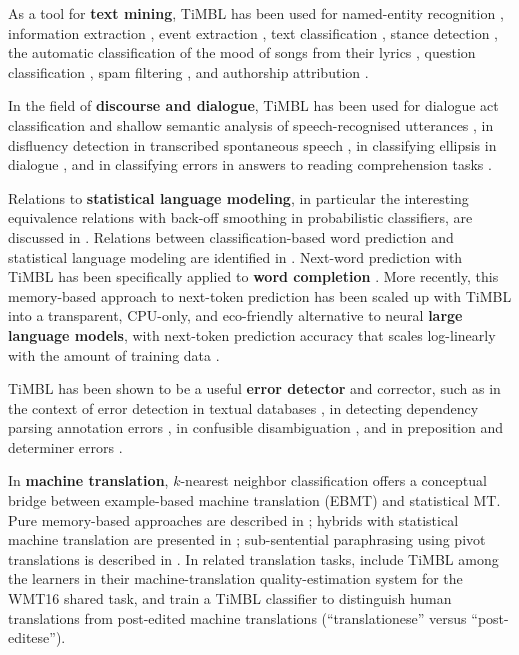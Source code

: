 \documentclass{book}
\begin{document}
As a tool for {\bf text mining}, TiMBL has been used for named-entity
recognition
\cite{Buchholz+00,Hendrickx+03,DeMeulder+03,Sporleder+06b,Leveling+06,VandenBosch+13c},
information extraction \cite{Zavrel+00b,Zavrel+03,Ahn06}, event
extraction \cite{Morante+09d}, text classification \cite{Spitters00},
stance detection \cite{Shenoy+17}, the automatic classification of the
mood of songs from their lyrics \cite{VanZaanen+10},
question classification \cite{Garcia+06,Dridan+07}, spam filtering
\cite{Androutsopoulos+00}, and authorship attribution
\cite{Luyckx+08,Kestemont+09}.

In the field of {\bf discourse and dialogue}, TiMBL has been used for
dialogue act classification and shallow semantic analysis of
speech-recognised utterances
\cite{Gustafson+99,Krahmer+01,VandenBosch+01,Lendvai+02a,Lendvai+03},
in disfluency detection in transcribed spontaneous speech
\cite{Lendvai+03c}, in classifying ellipsis in dialogue
\cite{Fernandez+04}, and in classifying errors in answers to reading
comprehension tasks \cite{Bailey+08}.

Relations to {\bf statistical language modeling}, in particular the
interesting equivalence relations with back-off smoothing in
probabilistic classifiers, are discussed in
\cite{Zavrel+97}. Relations between classification-based word
prediction and statistical language modeling are identified in
\cite{VandenBosch05,VandenBosch06,Stehouwer+09b}. Next-word prediction
with TiMBL has been specifically applied to {\bf word completion}
\cite{VandenBosch+08,VandenBosch11,Verberne+12,Stoop+14}. More
recently, this memory-based approach to next-token prediction has been
scaled up with TiMBL into a transparent, CPU-only, and eco-friendly
alternative to neural {\bf large language models}, with next-token
prediction accuracy that scales log-linearly with the amount of
training data \cite{VandenBosch+25}.

TiMBL has been shown to be a useful {\bf error detector} and
corrector, such as in the context of error detection in textual
databases \cite{Sporleder+06}, in detecting dependency parsing
annotation errors \cite{Dickinson09}, in confusible disambiguation
\cite{Stehouwer+09}, and in preposition and determiner errors
\cite{VandenBosch+12,VandenBosch+13}.

In {\bf machine translation}, $k$-nearest neighbor classification
offers a conceptual bridge between example-based machine translation
(EBMT) and statistical MT. Pure memory-based approaches are described
in \cite{VandenBosch+07,Canisius+09,VandenBosch+09,VanGompel+09};
hybrids with statistical machine translation are presented in
\cite{Stroppa+07,Haque+09,Haque+10}; sub-sentential paraphrasing using
pivot translations is described in \cite{Max09}. In related translation
tasks,  include TiMBL among the learners in their
machine-translation quality-estimation system for the WMT16 shared
task, and  train a TiMBL classifier to distinguish
human translations from post-edited machine translations
(``translationese'' versus ``post-editese'').
\end{document}

